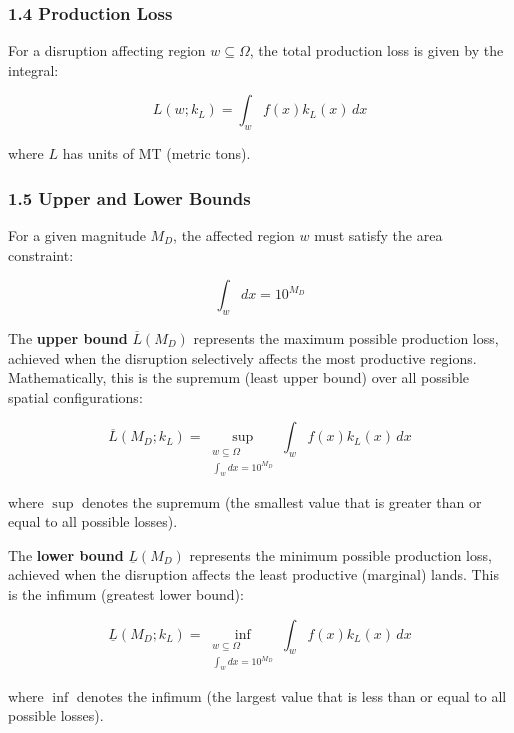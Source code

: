 \documentclass[11pt]{article}
\begin{document}
\subsubsection*{1.4 Production Loss}
For a disruption affecting region $w \subseteq \Omega$, the total production loss is given by the integral:

\begin{equation}
L(w; k_L) = \int_{w} f(x) k_L(x) \, dx
\label{eq:loss_continuous}
\end{equation}

where $L$ has units of MT (metric tons).

\subsubsection*{1.5 Upper and Lower Bounds}
For a given magnitude $M_D$, the affected region $w$ must satisfy the area constraint:

\begin{equation}
\int_{w} dx = 10^{M_D}
\label{eq:area_constraint_continuous}
\end{equation}

The \textbf{upper bound} $\overline{L}(M_D)$ represents the maximum possible production loss, achieved when the disruption selectively affects the most productive regions. Mathematically, this is the supremum (least upper bound) over all possible spatial configurations:

\begin{equation}
\overline{L}(M_D; k_L) = \sup_{\substack{w \subseteq \Omega \\ \int_{w} dx = 10^{M_D}}} \int_{w} f(x) k_L(x) \, dx
\label{eq:upper_continuous}
\end{equation}

where $\sup$ denotes the supremum (the smallest value that is greater than or equal to all possible losses).

The \textbf{lower bound} $\underline{L}(M_D)$ represents the minimum possible production loss, achieved when the disruption affects the least productive (marginal) lands. This is the infimum (greatest lower bound):

\begin{equation}
\underline{L}(M_D; k_L) = \inf_{\substack{w \subseteq \Omega \\ \int_{w} dx = 10^{M_D}}} \int_{w} f(x) k_L(x) \, dx
\label{eq:lower_continuous}
\end{equation}

where $\inf$ denotes the infimum (the largest value that is less than or equal to all possible losses).
\end{document}
